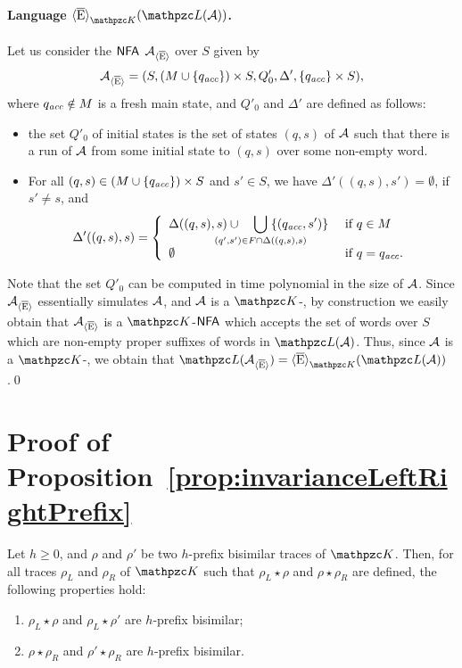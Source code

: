 \paragraph*{Language  $\hsEt_{\Ku}(\Lang(\Au))$.} Let us consider the $\text{\sffamily NFA}$ $\mathcal{A}_{\operatorname{\langle \overline{E}\rangle}}$ over $S$ given by
\[\mathcal{A}_{\operatorname{\langle \overline{E}\rangle}}=(S,(M\cup \{q_{\textit{acc}}\})\times S ,Q'_0,\Delta',\{q_{\textit{acc}}\}\times S),\] where $q_{\textit{acc}}\notin M$ is a fresh main state, and $Q'_0$ and $\Delta'$ are defined as follows:
\begin{itemize}
  \item the set $Q'_0$ of initial states is the set of states $(q,s)$ of $\mathcal{A}$ such that there is a run of $\mathcal{A}$ from some initial state to $(q,s)$ over some non-empty word.
  \item For all
$(q,s)\in (M\cup \{q_{\textit{acc}}\})\times S$ and $s'\in S$, we have $\Delta'((q,s),s')=\emptyset$, if $s'\neq s$, and 
%
\[%
\Delta'((q,s),s)=  \left\{
    \begin{array}{ll}
\Delta((q,s),s)\cup \quad  \displaystyle{\smashoperator{\bigcup_{(q',s')\in F\cap \Delta((q,s),s)}}}\; \{(q_\acc,s')\}
      &    \text{ if } q\in M
      \\
    \emptyset
      &    \text{ if } q= q_\acc.
    \end{array}
  \right.
\]
%
\end{itemize}
%
Note that the set $Q'_0$ can be computed in time polynomial in the size of $\mathcal{A}$. Since   $\mathcal{A}_{\operatorname{\langle \overline{E}\rangle}}$ essentially simulates $\mathcal{A}$, and $\mathcal{A}$ is
 a $\Ku$-\NFA, by construction we easily obtain that  $\mathcal{A}_{\operatorname{\langle \overline{E}\rangle}}$ is  a $\Ku$-$\text{\sffamily NFA}$ which accepts the set of words over $S$ which are
non-empty proper suffixes of words in $\Lang(\Au)$.
Thus, since $\mathcal{A}$ is a $\Ku$-\NFA, we obtain that $\Lang(\Au_{\hsEt})=\hsEt_{\Ku}(\Lang(\Au))$.\qed
 

\section{Proof of Proposition~\ref{prop:invarianceLeftRightPrefix}}
\label{proof:prop:invarianceLeftRightPrefix}

\begin{proposition*}[\ref{prop:invarianceLeftRightPrefix}] Let $h\geq 0$, and $\rho$ and $\rho'$ be two $h$-prefix  bisimilar traces of  $\Ku$. Then, for all traces $\rho_L$ and $\rho_R$ of $\Ku$ such that $\rho_L \star \rho$ and  $\rho \star \rho_R$ are defined, the following properties hold:
\begin{enumerate}
    \item $\rho_L\star \rho$ and $\rho_L\star \rho'$ are $h$-prefix   bisimilar; 
    \item $\rho\star \rho_R$ and $\rho'\star \rho_R$ are $h$-prefix  bisimilar.
\end{enumerate}
\end{proposition*}

